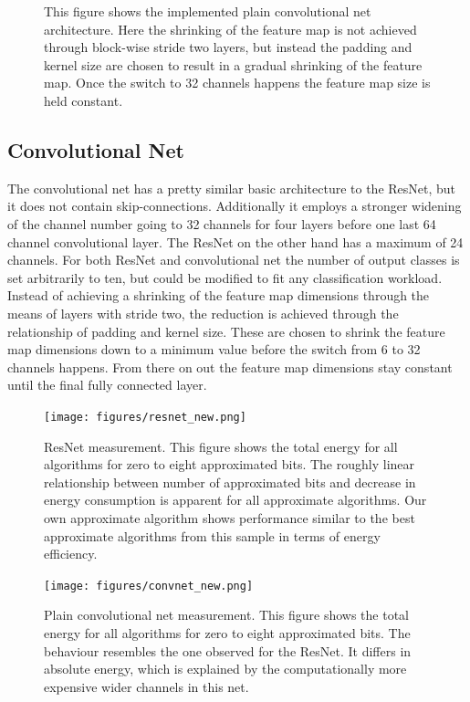 \documentclass[]{IEEEtran}
\begin{document}
\begin{figure}[h]
  \centering
   
  \caption{This figure shows the implemented plain convolutional net architecture. Here the shrinking of the feature map is not achieved through block-wise stride two layers, but instead the padding and kernel size are chosen to result in a gradual shrinking of the feature map. Once the switch to 32 channels happens the feature map size is held constant. }
\end{figure}

\subsection{Convolutional Net}
The convolutional net has a pretty similar basic architecture to the ResNet, but it does not contain skip-connections. Additionally it employs a stronger widening of the channel number going to 32 channels for four layers before one last 64 channel convolutional layer. The ResNet on the other hand has a maximum of 24 channels. For both ResNet and convolutional net the number of output classes is set arbitrarily to ten, but could be modified to fit any classification workload. Instead of achieving a shrinking of the feature map dimensions through the means of layers with stride two, the reduction is achieved through the relationship of padding and kernel size. These are chosen to shrink the feature map dimensions down to a minimum value before the switch from 6 to 32 channels happens. From there on out the feature map dimensions stay constant until the final fully connected layer. 

\begin{figure}[h]
	\centering
	\texttt{[image: figures/resnet\_new.png]}
	\caption{ResNet measurement. This figure shows the total energy for all algorithms for zero to eight approximated bits. The roughly linear relationship between number of approximated bits and decrease in energy consumption is apparent for all approximate algorithms. Our own approximate algorithm shows performance similar to the best approximate algorithms from this sample in terms of energy efficiency.}
	\label{fig:resnet_energy}
\end{figure}

\begin{figure}[h]
	\centering
	\texttt{[image: figures/convnet\_new.png]}
	\caption{Plain convolutional net measurement. This figure shows the total energy for all algorithms for zero to eight approximated bits. The behaviour resembles the one observed for the ResNet. It differs in absolute energy, which is explained by the computationally more expensive wider channels in this net.}
	\label{fig:resnet_energy}
\end{figure}
\end{document}
